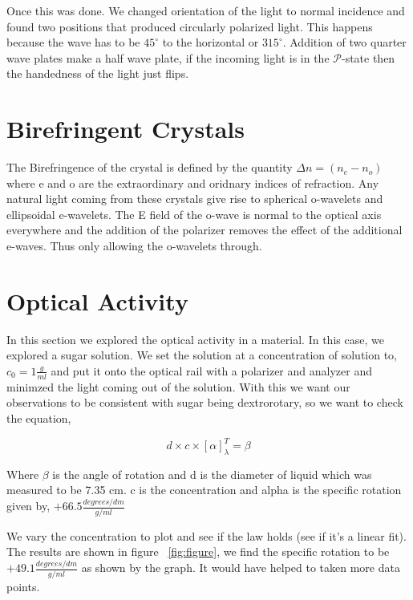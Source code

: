 \documentclass[paper=a4, fontsize=11pt]{scrartcl} %
\numberwithin{equation}{section}
\numberwithin{figure}{section}
\numberwithin{table}{section}
\begin{document}
Once this was done. We changed orientation of the light to normal incidence and found two positions that produced circularly polarized light. This happens because the wave has to be $45^{\circ}$ to the horizontal or $315^{\circ}$. Addition of two quarter wave plates make a half wave plate, if the incoming light is in the $\mathcal{P}$-state then the handedness of the light just flips.
\section{Birefringent Crystals}
The Birefringence of the crystal is defined by the quantity $\Delta n = (n_e-n_o)$  where e and o are the extraordinary and oridnary indices of refraction. Any natural light coming from these crystals give rise to spherical o-wavelets and ellipsoidal e-wavelets. The E field of the o-wave is normal to the optical axis everywhere and the addition of the polarizer removes the effect of the additional e-waves. Thus only allowing the o-wavelets through.
\section{Optical Activity}
In this section we explored the optical activity in a material.  In this case, we explored a sugar solution. We set the solution at a concentration of solution to, $c_0 = 1 \frac{g}{ml}$ and put it onto the optical rail with a polarizer and analyzer and minimzed the light coming out of the solution. With this we want our observations to be consistent with sugar being dextrorotary, so we want to check the equation,

\begin{equation}
d\times c\times [\alpha]_{\lambda}^T = \beta
\end{equation}

Where $\beta$ is the angle of rotation and d is the diameter of liquid which was measured to be 7.35 cm. c is the concentration and alpha is the specific rotation given by, 
$+66.5 \frac{degrees/dm}{g/ml}$

We vary the concentration to plot and see if the law holds (see if it's a linear fit). The results are shown in figure ~\ref{fig:figure}, we find the specific rotation to be $+49.1 \frac{degrees/dm}{g/ml}$ as shown by the graph. It would have helped to taken more data points.
\end{document}
